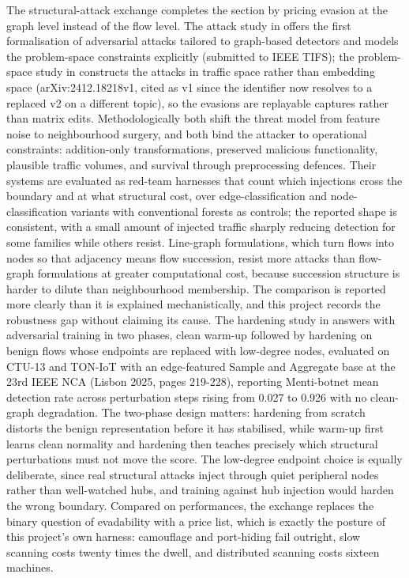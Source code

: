 The structural-attack exchange completes the section by pricing evasion at the graph level instead of the flow level. The attack study in \cite{k25} offers the first formalisation of adversarial attacks tailored to graph-based detectors and models the problem-space constraints explicitly (submitted to IEEE TIFS); the problem-space study in \cite{k26} constructs the attacks in traffic space rather than embedding space (arXiv:2412.18218v1, cited as v1 since the identifier now resolves to a replaced v2 on a different topic), so the evasions are replayable captures rather than matrix edits. Methodologically both shift the threat model from feature noise to neighbourhood surgery, and both bind the attacker to operational constraints: addition-only transformations, preserved malicious functionality, plausible traffic volumes, and survival through preprocessing defences. Their systems are evaluated as red-team harnesses that count which injections cross the boundary and at what structural cost, over edge-classification and node-classification variants with conventional forests as controls; the reported shape is consistent, with a small amount of injected traffic sharply reducing detection for some families while others resist. Line-graph formulations, which turn flows into nodes so that adjacency means flow succession, resist more attacks than flow-graph formulations at greater computational cost, because succession structure is harder to dilute than neighbourhood membership. The comparison is reported more clearly than it is explained mechanistically, and this project records the robustness gap without claiming its cause. The hardening study in \cite{k27} answers with adversarial training in two phases, clean warm-up followed by hardening on benign flows whose endpoints are replaced with low-degree nodes, evaluated on CTU-13 and TON-IoT with an edge-featured Sample and Aggregate base at the 23rd IEEE NCA (Lisbon 2025, pages 219-228), reporting Menti-botnet mean detection rate across perturbation steps rising from 0.027 to 0.926 with no clean-graph degradation. The two-phase design matters: hardening from scratch distorts the benign representation before it has stabilised, while warm-up first learns clean normality and hardening then teaches precisely which structural perturbations must not move the score. The low-degree endpoint choice is equally deliberate, since real structural attacks inject through quiet peripheral nodes rather than well-watched hubs, and training against hub injection would harden the wrong boundary. Compared on performances, the exchange replaces the binary question of evadability with a price list, which is exactly the posture of this project's own harness: camouflage and port-hiding fail outright, slow scanning costs twenty times the dwell, and distributed scanning costs sixteen machines.

